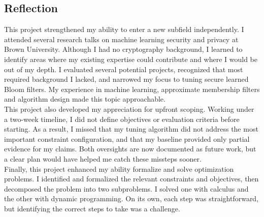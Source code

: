 \subsection{Reflection}


This project strengthened my ability to enter a new subfield independently. I attended several research talks on machine learning security and privacy at Brown 
University. Although I had no cryptography background, I learned to identify areas where my existing expertise could contribute and where I would be out of my 
depth. I evaluated several potential projects, recognized that most required background I lacked, and narrowed my focus to tuning secure learned Bloom filters. 
My experience in machine learning, approximate membership filters and algorithm design made this topic approachable. \\

\noindent
This project also developed my appreciation for upfront scoping. Working under a two-week timeline, I did not define objectives or evaluation criteria before 
starting. As a result, I missed that my tuning algorithm did not address the most important constraint configuration, and that my baseline provided only partial
evidence for my claims. Both oversights are now documented as future work, but a clear plan would have helped me catch these missteps sooner. \\

\noindent
Finally, this project enhanced my ability formalize and solve optimization problems. I identified and formalized the relevant constraints and objectives, then
decomposed the problem into two subproblems. I solved one with calculus and the other with dynamic programming. On its own, each step was straightforward, but
identifying the correct steps to take was a challenge.
